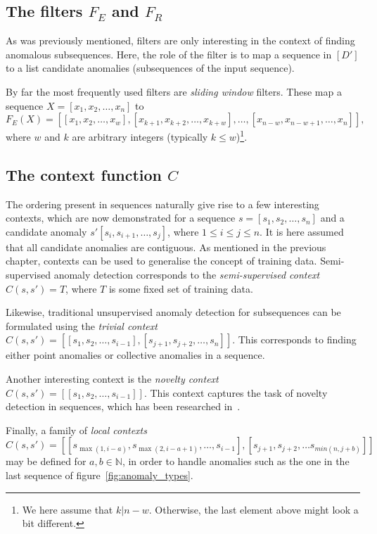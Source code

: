 \subsection{The filters $F_E$ and $F_R$}

As was previously mentioned, filters are only interesting in the context of finding anomalous subsequences. Here, the role of the filter is to map a sequence in $[D']$ to a list candidate anomalies (subsequences of the input sequence).

By far the most frequently used filters are \emph{sliding window} filters. These map a sequence $X = [x_1, x_2, \dots, x_n]$ to
\[
    F_E(X) = [[x_1, x_2, \dots, x_w], [x_{k + 1}, x_{k + 2}, \dots, x_{k + w}], \dots, [x_{n - w}, x_{n - w + 1}, \dots, x_n]],
\]
where $w$ and $k$ are arbitrary integers (typically $k \leq w$)\footnote{We here assume that $k | n - w$. Otherwise, the last element above might look a bit different.}.

\subsection{The context function $C$}

The ordering present in sequences naturally give rise to a few interesting contexts, which are now demonstrated for a sequence $s = [s_1, s_2, \dots, s_n]$ and a candidate anomaly $s' [s_i, s_{i + 1}, \dots, s_j]$, where $1 \leq i \leq j \leq n$. It is here assumed that all candidate anomalies are contiguous. As mentioned in the previous chapter, contexts can be used to generalise the concept of training data. Semi-supervised anomaly detection corresponds to the \emph{semi-supervised context} $C(s, s') = T$, where $T$ is some fixed set of training data.

Likewise, traditional unsupervised anomaly detection for subsequences can be formulated using the \emph{trivial context} $C(s, s') = [[s_1, s_2, \dots, s_{i - 1}], [s_{j + 1}, s_{j + 2}, \dots, s_n]]$. This corresponds to finding either point anomalies or collective anomalies in a sequence.

Another interesting context is the \emph{novelty context} $C(s, s') = [[s_1, s_2, \dots, s_{i - 1}]]$. This context captures the task of novelty detection in sequences, which has been researched in~\cite{TODO}.

Finally, a family of \emph{local contexts}
\[
    C(s, s') = [[s_{\max(1, i - a)}, s_{\max(2, i - a + 1)}, \dots, s_{i-1}], [s_{j+1}, s_{j+2}, \ldots s_{min(n, j+b)}]]
\]
may be defined for $a, b \in \mathbb{N}$, in order to handle anomalies such as the one in the last sequence of figure~\ref{fig:anomaly_types}.

